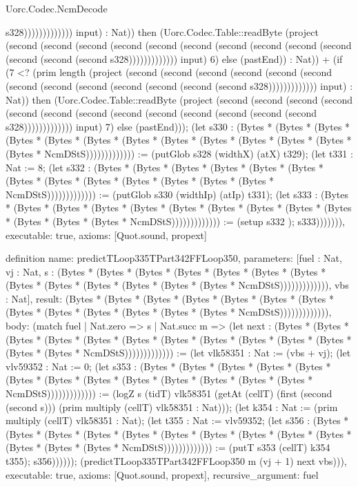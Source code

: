 \begin{lexlean}{Uorc.Codec.NcmDecode}
\begin{semanticmodule}
{s328))))))))))))) input) : Nat)) then (Uorc.Codec.Table::readByte (project (second (second (second (second (second (second (second (second (second (second (second (second (second s328))))))))))))) input) 6) else (pastEnd)) : Nat)) + (if (7 <? (prim length (project (second (second (second (second (second (second (second (second (second (second (second (second (second s328))))))))))))) input) : Nat)) then (Uorc.Codec.Table::readByte (project (second (second (second (second (second (second (second (second (second (second (second (second (second s328))))))))))))) input) 7) else (pastEnd))); (let s330 : (Bytes * (Bytes * (Bytes * (Bytes * (Bytes * (Bytes * (Bytes * (Bytes * (Bytes * (Bytes * (Bytes * (Bytes * (Bytes * NcmDStS))))))))))))) := (putGlob s328 (widthX) (atX) t329); (let t331 : Nat := 8; (let s332 : (Bytes * (Bytes * (Bytes * (Bytes * (Bytes * (Bytes * (Bytes * (Bytes * (Bytes * (Bytes * (Bytes * (Bytes * (Bytes * NcmDStS))))))))))))) := (putGlob s330 (widthIp) (atIp) t331); (let s333 : (Bytes * (Bytes * (Bytes * (Bytes * (Bytes * (Bytes * (Bytes * (Bytes * (Bytes * (Bytes * (Bytes * (Bytes * (Bytes * NcmDStS))))))))))))) := (setup s332 ); s333))))))),
  executable: true,
  axioms: [Quot.sound, propext]
}

definition{
  name: predictTLoop335TPart342FFLoop350,
  parameters: [fuel : Nat, vj : Nat, s : (Bytes * (Bytes * (Bytes * (Bytes * (Bytes * (Bytes * (Bytes * (Bytes * (Bytes * (Bytes * (Bytes * (Bytes * (Bytes * NcmDStS))))))))))))), vbs : Nat],
  result: (Bytes * (Bytes * (Bytes * (Bytes * (Bytes * (Bytes * (Bytes * (Bytes * (Bytes * (Bytes * (Bytes * (Bytes * (Bytes * NcmDStS))))))))))))),
  body: (match fuel
    | Nat.zero => s
    | Nat.succ m => (let next : (Bytes * (Bytes * (Bytes * (Bytes * (Bytes * (Bytes * (Bytes * (Bytes * (Bytes * (Bytes * (Bytes * (Bytes * (Bytes * NcmDStS))))))))))))) := (let vlk58351 : Nat := (vbs + vj); (let vlv59352 : Nat := 0; (let s353 : (Bytes * (Bytes * (Bytes * (Bytes * (Bytes * (Bytes * (Bytes * (Bytes * (Bytes * (Bytes * (Bytes * (Bytes * (Bytes * NcmDStS))))))))))))) := (logZ s (tidT) vlk58351 (getAt (cellT) (first (second (second s))) (prim multiply (cellT) vlk58351 : Nat))); (let k354 : Nat := (prim multiply (cellT) vlk58351 : Nat); (let t355 : Nat := vlv59352; (let s356 : (Bytes * (Bytes * (Bytes * (Bytes * (Bytes * (Bytes * (Bytes * (Bytes * (Bytes * (Bytes * (Bytes * (Bytes * (Bytes * NcmDStS))))))))))))) := (putT s353 (cellT) k354 t355); s356)))))); (predictTLoop335TPart342FFLoop350 m (vj + 1) next vbs))),
  executable: true,
  axioms: [Quot.sound, propext],
  recursive_argument: fuel
}


\end{semanticmodule}
\end{lexlean}

